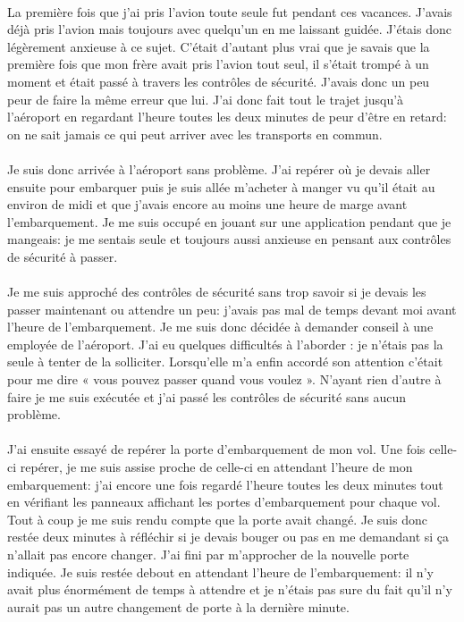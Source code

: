 \paragraph{} La première fois que j'ai pris l'avion toute seule fut pendant ces
vacances. J'avais déjà pris l'avion mais toujours avec quelqu'un en me laissant
guidée. J'étais donc légèrement anxieuse à ce sujet. C'était d'autant plus vrai
que je savais que la première fois que mon frère avait pris l'avion tout seul,
il s'était trompé à un moment et était passé à travers les contrôles de
sécurité. J'avais donc un peu peur de faire la même erreur que lui. J'ai donc
fait tout le trajet jusqu'à l'aéroport en regardant l'heure toutes les deux
minutes de peur d'être en retard: on ne sait jamais ce qui peut arriver avec
les transports en commun.

\paragraph{} Je suis donc arrivée à l'aéroport sans problème. J'ai repérer où
je devais aller ensuite pour embarquer puis je suis allée m'acheter à manger vu
qu'il était au environ de midi et que j'avais encore au moins une heure de
marge avant l'embarquement. Je me suis occupé en jouant sur une application
pendant que je mangeais: je me sentais seule et toujours aussi anxieuse en
pensant aux contrôles de sécurité à passer.

\paragraph{} Je me suis approché des contrôles de sécurité sans trop savoir si
je devais les passer maintenant ou attendre un peu: j'avais pas mal de temps
devant moi avant l'heure de l'embarquement. Je me suis donc décidée à demander
conseil à une employée de l'aéroport. J'ai eu quelques difficultés à l'aborder
: je n'étais pas la seule à tenter de la solliciter. Lorsqu'elle m'a enfin
accordé son attention c'était pour me dire « vous pouvez passer quand vous
voulez ». N'ayant rien d'autre à faire je me suis exécutée et j'ai passé les
contrôles de sécurité sans aucun problème.

\paragraph{} J'ai ensuite essayé de repérer la porte d'embarquement de mon vol.
Une fois celle-ci repérer, je me suis assise proche de celle-ci en attendant
l'heure de mon embarquement: j'ai encore une fois regardé l'heure toutes les
deux minutes tout en vérifiant les panneaux affichant les portes d'embarquement
pour chaque vol. Tout à coup je me suis rendu compte que la porte avait changé.
Je suis donc restée deux minutes à réfléchir si je devais bouger ou pas en me
demandant si ça n'allait pas encore changer. J'ai fini par m'approcher de la
nouvelle porte indiquée. Je suis restée debout en attendant l'heure de
l'embarquement: il n'y avait plus énormément de temps à attendre et je n'étais
pas sure du fait qu'il n'y aurait pas un autre changement de porte à la
dernière minute.

